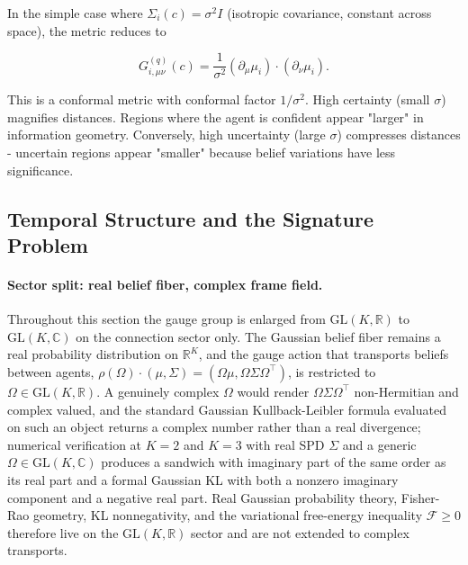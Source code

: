\documentclass[11pt]{article}
\begin{document}
In the simple case where $\Sigma_i(c) = \sigma^2 I$ (isotropic covariance, constant across space), the metric reduces to

\begin{equation}
G^{(q)}_{i,\mu\nu}(c) = \frac{1}{\sigma^2}(\partial_\mu \mu_i) \cdot (\partial_\nu \mu_i).
\end{equation}

This is a conformal metric with conformal factor $1/\sigma^2$. High certainty (small $\sigma$) magnifies distances.  Regions where the agent is confident appear "larger" in information geometry. Conversely, high uncertainty (large $\sigma$) compresses distances - uncertain regions appear "smaller" because belief variations have less significance.

\subsection{Temporal Structure and the Signature Problem}
\label{sec:signature_resolution}

\paragraph{Sector split: real belief fiber, complex frame field.}
Throughout this section the gauge group is enlarged from $\mathrm{GL}(K, \mathbb{R})$ to $\mathrm{GL}(K, \mathbb{C})$ on the connection sector only. The Gaussian belief fiber remains a real probability distribution on $\mathbb{R}^K$, and the gauge action that transports beliefs between agents, $\rho(\Omega) \cdot (\mu, \Sigma) = (\Omega \mu, \Omega \Sigma \Omega^\top)$, is restricted to $\Omega \in \mathrm{GL}(K, \mathbb{R})$. A genuinely complex $\Omega$ would render $\Omega \Sigma \Omega^\top$ non-Hermitian and complex valued, and the standard Gaussian Kullback-Leibler formula evaluated on such an object returns a complex number rather than a real divergence; numerical verification at $K=2$ and $K=3$ with real SPD $\Sigma$ and a generic $\Omega \in \mathrm{GL}(K, \mathbb{C})$ produces a sandwich with imaginary part of the same order as its real part and a formal Gaussian KL with both a nonzero imaginary component and a negative real part. Real Gaussian probability theory, Fisher-Rao geometry, KL nonnegativity, and the variational free-energy inequality $\mathcal{F} \ge 0$ therefore live on the $\mathrm{GL}(K, \mathbb{R})$ sector and are not extended to complex transports.
\end{document}
